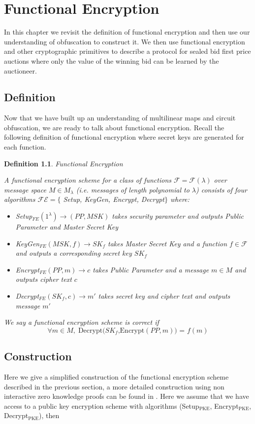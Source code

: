 \documentclass[12pt,twoside]{reedthesis}
\newtheorem{definition}{Definition}
\begin{document}
    \chapter{Functional Encryption}
    
    In this chapter we revisit the definition of functional encryption and then use our understanding of obfuscation to construct it. We then use functional encryption and other cryptographic primitives to describe a protocol for sealed bid first price auctions where only the value of the winning bid can be learned by the auctioneer.    
    \section{Definition}
    Now that we have built up an understanding of multilinear maps and circuit obfuscation, we are ready to talk about functional encryption. Recall the following definition of functional encryption where secret keys are generated for each function.
    \begin{definition}{Functional Encryption}
    \par A functional encryption scheme for a class of functions $\mathcal{F} = \mathcal{F}(\lambda)$ over message space $M \in M_\lambda$ (i.e. messages of length polynomial to $\lambda$) consists of four algorithms $\mathcal{FE} = \{$ Setup, KeyGen, Encrypt, Decrypt$\}$ where:
    \begin{itemize}
    \item Setup$_{FE}(1^\lambda) \to (PP, MSK)$ takes security parameter and outputs Public Parameter and Master Secret Key 
    \item KeyGen$_{FE}(MSK,f)\to SK_f$ takes Master Secret Key and a function $f\in \mathcal{F}$ and outputs a corresponding secret key $SK_f$
    \item Encrypt$_{FE}(PP,m) \to c$ takes Public Parameter and a message $m\in M$ and outputs cipher text $c$
    \item Decrypt$_{FE}(SK_f,c)\to m'$ takes secret key and cipher text and outputs message $m'$
    \end{itemize}
    \par We say a functional encryption scheme is correct if $$\forall m \in M, \; \text{Decrypt$(SK_f$,Encrypt$(PP,m))$ = $f(m)$}$$
    \end{definition}
    
    \section{Construction}
    Here we give a simplified construction of the functional encryption scheme described in the previous section, a more detailed construction using non interactive zero knowledge proofs can be found in \cite{Garg:2013}. Here we assume that we have access to a public key encryption scheme with algorithms (Setup$_{\text{PKE}}$, Encrypt$_{\text{PKE}}$, Decrypt$_{\text{PKE}}$), then
    
\end{document}

